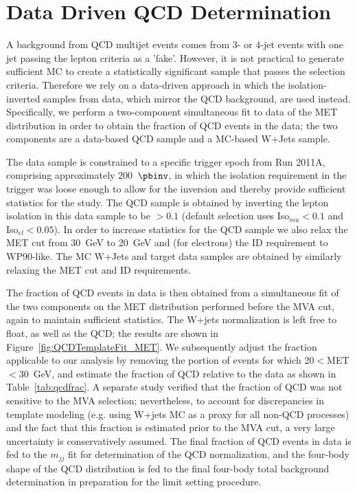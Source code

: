 \section{Data Driven QCD Determination}
\label{sec:dataDrivenQCD}

A background from QCD multijet events comes from 3- or 4-jet events
with one jet passing the lepton criteria as a 'fake'. However, it is
not practical to generate sufficient MC to create a statistically
significant sample that passes the selection criteria. Therefore we
rely on a data-driven approach in which the isolation-inverted samples
from data, which mirror the QCD background, are used instead.
Specifically, we perform a two-component simultaneous fit to data of
the MET distribution in order to obtain the fraction of QCD events in
the data; the two components are a data-based QCD sample and a
MC-based W+Jets sample.

The data sample is constrained to a specific trigger epoch from Run
2011A, comprising approximately 200~$\pbinv$, in which the isolation
requirement in the trigger was loose enough to allow for the inversion
and thereby provide sufficient statistics for the study. The QCD sample is
obtained by inverting the lepton isolation in this data sample to be
$>0.1$ (default selection uses Iso$_{mu}<0.1$ and Iso$_{el}<0.05$).
In order to increase statistics for the QCD sample we also relax the
MET cut from 30~GeV to 20~GeV and (for electrons) the ID requirement
to WP90-like.  The MC W+Jets and target data samples are obtained by
similarly relaxing the MET cut and ID requirements.

The fraction of QCD events in data is then obtained from a
simultaneous fit of the two components on the MET distribution
performed before the MVA cut, again to maintain sufficient statistics.
The W+jets normalization is left free to float, as well as the QCD;
the results are shown in Figure~\ref{fig:QCDTemplateFit_MET}.  We
subsequently adjust the fraction applicable to our analysis by
removing the portion of events for which 20$<$MET$<$30~GeV, and
estimate the fraction of QCD relative to the data as shown in
Table~\ref{tab:qcdfrac}.  A separate study verified
that the fraction of QCD was not sensitive to the MVA selection;
nevertheless, to account for discrepancies in template modeling
(e.g. using W+jets MC as a proxy for all non-QCD processes) and the
fact that this fraction is estimated prior to the MVA cut, a very
large uncertainty is conservatively assumed. The final fraction of QCD
events in data is fed to the $m_{jj}$ fit for determination of the QCD
normalization, and the four-body shape of the QCD distribution is fed
to the final four-body total background determination in preparation
for the limit setting procedure.


